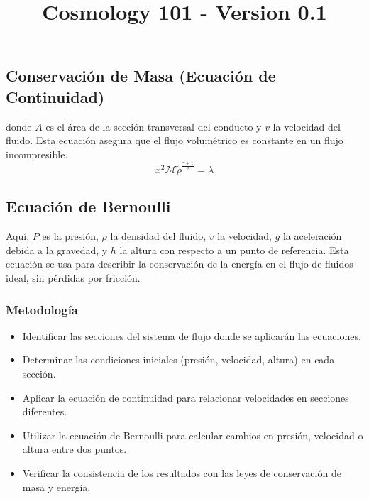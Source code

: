 \documentclass{article}\usepackage{graphicx} \usepackage{amsmath} \usepackage{colortbl}\title{Cosmology 101 - Version 0.1}
\begin{document}
\subsection{Conservaci{\'o}n de Masa (Ecuaci{\'o}n de Continuidad)}
donde $A$ es el {\'a}rea de la sección transversal del conducto y $v$ la velocidad del fluido. Esta ecuación asegura que el flujo volumétrico es constante en un flujo incompresible. \begin{equation}x^2 \mathcal{M} \tilde{\rho }^{\frac{\gamma +1}{2}}=\lambda \label{ber1} \end{equation}\subsection{Ecuaci{\'o}n de Bernoulli}
Aquí, $P$ es la presión, $\rho$ la densidad del fluido, $v$ la velocidad, $g$ la aceleración debida a la gravedad, y $h$ la altura con respecto a un punto de referencia. Esta ecuaci{\'o}n se usa para describir la conservación de la energía en el flujo de fluidos ideal, sin pérdidas por fricción.
\subsubsection{Metodolog{\'i}a}
\begin{itemize}
\item Identificar las secciones del sistema de flujo donde se aplicarán las ecuaciones.
\item Determinar las condiciones iniciales (presión, velocidad, altura) en cada sección.
\item Aplicar la ecuación de continuidad para relacionar velocidades en secciones diferentes.
\item Utilizar la ecuación de Bernoulli para calcular cambios en presión, velocidad o altura entre dos puntos.
\item Verificar la consistencia de los resultados con las leyes de conservación de masa y energía.
\end{itemize}
\end{document}
